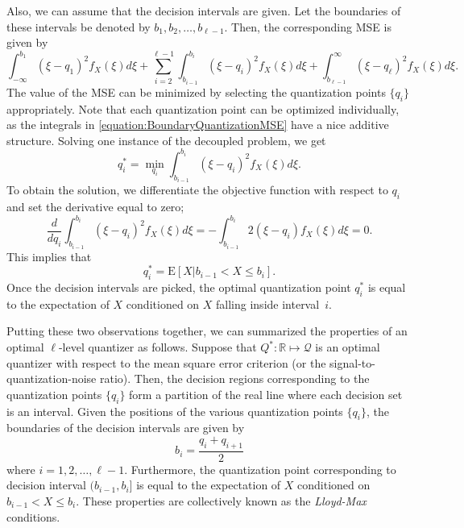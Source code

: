 Also, we can assume that the decision intervals are given.
Let the boundaries of these intervals be denoted by $b_1, b_2, \ldots, b_{\ell-1}$.
Then, the corresponding MSE is given by
\begin{equation} \label{equation:BoundaryQuantizationMSE}
\int_{-\infty}^{b_1} (\xi - q_1)^2 f_X(\xi) d\xi
+ \sum_{i=2}^{{\ell}-1}
\int_{b_{i-1}}^{b_i} (\xi - q_i)^2 f_X(\xi) d\xi
+ \int_{b_{\ell-1}}^{\infty} (\xi - q_{\ell})^2 f_X(\xi) d\xi .
\end{equation}
The value of the MSE can be minimized by selecting the quantization points $\{ q_i \}$ appropriately.
Note that each quantization point can be optimized individually, as the integrals in \eqref{equation:BoundaryQuantizationMSE} have a nice additive structure.
Solving one instance of the decoupled problem, we get
\begin{equation*}
q_i^* = \min_{q_i} \int_{b_{i-1}}^{b_i} (\xi - q_i)^2 f_X(\xi) d\xi .
\end{equation*}
To obtain the solution, we differentiate the objective function with respect to $q_i$ and set the derivative equal to zero;
\begin{equation*}
\frac{d}{d q_i} \int_{b_{i-1}}^{b_i} (\xi - q_i)^2 f_X(\xi) d\xi
= - \int_{b_{i-1}}^{b_i} 2 (\xi - q_i) f_X(\xi) d\xi = 0 .
\end{equation*}
This implies that
\begin{equation*}
q_i^* = \mathrm{E} [ X | b_{i-1} < X \leq b_i ] .
\end{equation*}
Once the decision intervals are picked, the optimal quantization point $q_i^*$ is equal to the expectation of $X$ conditioned on $X$ falling inside interval~$i$.

Putting these two observations together, we can summarized the properties of an optimal $\ell$-level quantizer as follows.
Suppose that $Q^* : \mathbb{R} \mapsto \mathcal{Q}$ is an optimal quantizer with respect to the mean square error criterion (or the signal-to-quantization-noise ratio).
Then, the decision regions corresponding to the quantization points $\{ q_i \}$ form a partition of the real line where each decision set is an interval.
Given the positions of the various quantization points $\{ q_i \}$, the boundaries of the decision intervals are given by
\begin{equation*}
b_i = \frac{q_i + q_{i+1}}{2}
\end{equation*}
where $i = 1, 2, \ldots, \ell-1$.
Furthermore, the quantization point corresponding to decision interval $(b_{i-1}, b_i]$ is equal to the expectation of $X$ conditioned on $b_{i-1} < X \leq b_i$.
These properties are collectively known as the \emph{Lloyd-Max} conditions.


